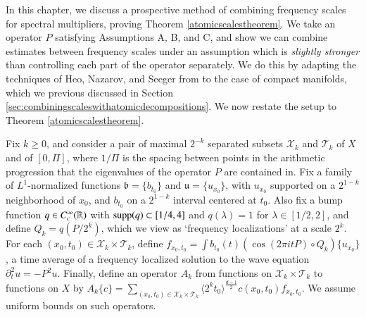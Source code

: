 
In this chapter, we discuss a prospective method of combining frequency scales for spectral multipliers, proving Theorem \ref{atomicscalestheorem}. We take an operator $P$ satisfying Assumptions A, B, and C, and show we can combine estimates between frequency scales under an assumption which is \emph{slightly stronger} than controlling each part of the operator separately. We do this by adapting the techniques of Heo, Nazarov, and Seeger from \cite{HeoandNazarovandSeeger2} to the case of compact manifolds, which we previous discussed in Section \ref{sec:combiningscaleswithatomicdecompositions}. We now restate the setup to Theorem \ref{atomicscalestheorem}.
    
Fix $k \geq 0$, and consider a pair of maximal $2^{-k}$ separated subsets $\mathcal{X}_k$ and $\mathcal{T}_k$ of $X$ and of $[0,\Pi]$, where $1/\Pi$ is the spacing between points in the arithmetic progression that the eigenvalues of the operator $P$ are contained in. Fix a family of $L^1$-normalized functions $\mathfrak{b} = \{ b_{t_0} \}$ and $\mathfrak{u} = \{ u_{x_0} \}$, with $u_{x_0}$ supported on a $2^{1-k}$ neighborhood of $x_0$, and $b_{t_0}$ on a $2^{1-k}$ interval centered at $t_0$. Also fix a bump function $q \in C_c^\infty(\operatorname{\mathbb{R}})$ with $\operatorname{\text{supp}}(q) \subset [1/4,4]$ and $q(\lambda) = 1$ for $\lambda \in [1/2,2]$, and define $Q_k = q(P/2^k)$, which we view as `frequency localizations' at a scale $2^k$. For each $(x_0,t_0) \in \mathcal{X}_k \times \mathcal{T}_k$, define $f_{x_0,t_0} = \int b_{t_0}(t) (\cos(2 \pi i t P) \circ Q_k) \{ u_{x_0} \}$, a time average of a frequency localized solution to the wave equation $\partial_t^2 u = - P^2 u$. Finally, define an operator $A_k$ from functions on $\mathcal{X}_k \times \mathcal{T}_k$ to functions on $X$ by $A_k \{ c \} = \sum\nolimits_{(x_0,t_0) \in \mathcal{X}_k \times \mathcal{T}_k} \langle 2^k t_0 \rangle^{\frac{d-1}{2}} c(x_0,t_0) f_{x_0,t_0}$. We assume uniform bounds on such operators.

\vspace{0.5em}

\noindent {}
\vspace{0.4em}

